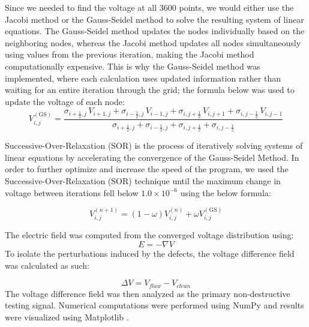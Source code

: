 \documentclass[reprint,amsmath,amssymb,aps]{revtex4-2}
\begin{document}
Since we needed to find the voltage at all 3600 points, we would either use the Jacobi method or the Gauss-Seidel \cite{4} method to solve the resulting system of linear equations. The Gauss-Seidel method updates the nodes individually based on the neighboring nodes, whereas the Jacobi method updates all nodes simultaneously using values from the previous iteration, making the Jacobi method computationally expensive. This is why the Gauss-Seidel method was implemented, where each calculation uses updated information rather than waiting for an entire iteration through the grid; the formula below was used to update the voltage of each node:
\vspace{1em}
\scriptsize
\begin{equation} 
V_{i,j}^{(\mathrm{GS})} = \frac{\sigma_{i+\frac{1}{2},j} \, V_{i+1,j} + \sigma_{i-\frac{1}{2},j} \, V_{i-1,j} + \sigma_{i,j+\frac{1}{2}} \, V_{i,j+1} + \sigma_{i,j-\frac{1}{2}} \, V_{i,j-1}}{\sigma_{i+\frac{1}{2},j} + \sigma_{i-\frac{1}{2},j} + \sigma_{i,j+\frac{1}{2}} + \sigma_{i,j-\frac{1}{2}}}
\end{equation}
\label{Gauss-Seidel update formula}
\vspace{0.5em}
\normalsize

Successive-Over-Relaxation \cite{5} (SOR) is the process of iteratively solving systems of linear equations by accelerating the convergence of the Gauss-Seidel Method. In order to further optimize and increase the speed of the program, we used the Successive-Over-Relaxation (SOR) technique until the maximum change in voltage between iterations fell below $1.0 \times 10^{-6}$ using the below formula:


\begin{equation} 
    V_{i,j}^{(n+1)} = (1-\omega)V_{i,j}^{(n)} + \omega V_{i,j}^{(\mathrm{GS})}
\end{equation}
\vspace{0.5em} 


The electric field was computed from the converged voltage distribution using:
\begin{equation}
    E = -\nabla V
\end{equation} \label{Electric field}
To isolate the perturbations induced by the defects, the voltage difference field was calculated as such:

\begin{equation} \Delta V = V_{flaw} - V_{clean} \end{equation}\label{Voltage difference field}
The voltage difference field was then analyzed as the primary non-destructive testing signal. Numerical computations were performed using NumPy \cite{6} and results were visualized using Matplotlib \cite{7}.
\end{document}
